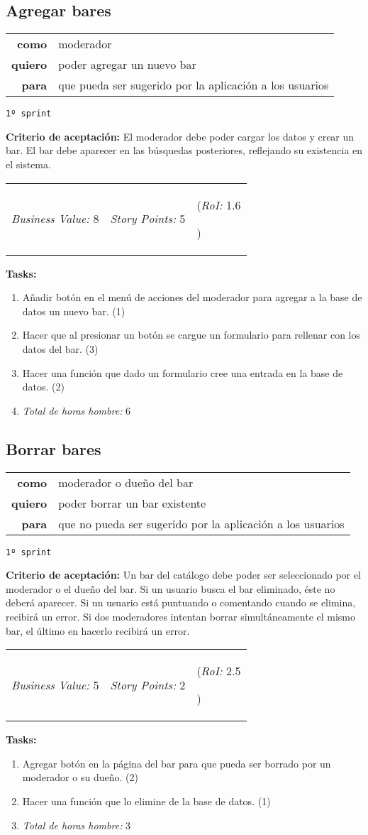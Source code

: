 \documentclass[hidelinks,a4paper,11pt, nofootinbib]{article}
\newcommand{\userstory}[3]{
\begin{tabular}{|r p{10cm}|}
  \hline
  \textbf{como} & #1 \\
  \textbf{quiero} & #2 \\
  \textbf{para} & #3 \\
  \hline
\end{tabular}

}
\newcommand{\critdeacep}[1]{\textbf{Criterio de aceptación:} #1

}
\newcommand{\busvalue}[1]{\textit{Business Value:} #1

}
\newcommand{\storypoints}[1]{\textit{Story Points:} #1

}
\newcommand{\roi}[1]{\textit{RoI:} #1

}
\newcommand{\valores}[3]{
\begin{tabular}{l l l}
  \busvalue{#1} & \storypoints{#2} & (\roi{#3}) \\ 
\end{tabular}

}
\newcommand{\primersprint}{\texttt{1º sprint}

}
\newcommand{\tasks}[1]{\textbf{Tasks:} 

#1}
\begin{document}
\subsection*{Agregar bares}
\userstory{moderador}{poder agregar un nuevo bar}{que pueda ser sugerido por la aplicación a los usuarios}
\primersprint
\critdeacep{El moderador debe poder cargar los datos y crear un bar. El bar debe aparecer en las búsquedas posteriores, reflejando su existencia en el sistema.}
\valores{8}{5}{1.6}
\tasks{
  \begin{enumerate}
    \item Añadir botón en el menú de acciones del moderador para agregar a la base de datos un nuevo bar. (1)
    \item Hacer que al presionar un botón se cargue un formulario para rellenar con los datos del bar. (3)
    \item Hacer una función que dado un formulario cree una entrada en la base de datos. (2)
    \item[] \textit{Total de horas hombre:} 6
  \end{enumerate}
}

\subsection*{Borrar bares}
\userstory{moderador o dueño del bar}{poder borrar un bar existente}{que no pueda ser sugerido por la aplicación a los usuarios}
\primersprint
\critdeacep{Un bar del catálogo debe poder ser seleccionado por el moderador o el dueño del bar. Si un usuario busca el bar eliminado, éste no deberá aparecer. Si un usuario está puntuando o comentando cuando se elimina, recibirá un error. Si dos moderadores intentan borrar simultáneamente el mismo bar, el último en hacerlo recibirá un error.}
\valores{5}{2}{2.5}
\tasks{
  \begin{enumerate}
    \item Agregar botón en la página del bar para que pueda ser borrado por un moderador o su dueño. (2)
    \item Hacer una función que lo elimine de la base de datos. (1)
    \item[] \textit{Total de horas hombre:} 3
  \end{enumerate}
}
\end{document}
